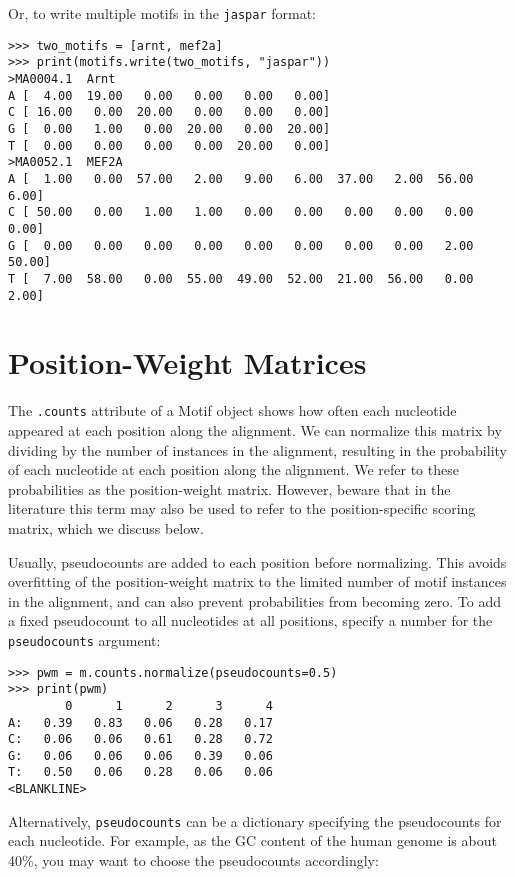 Or, to write multiple motifs in the \verb+jaspar+ format:
\begin{verbatim}
>>> two_motifs = [arnt, mef2a]
>>> print(motifs.write(two_motifs, "jaspar"))
>MA0004.1  Arnt
A [  4.00  19.00   0.00   0.00   0.00   0.00]
C [ 16.00   0.00  20.00   0.00   0.00   0.00]
G [  0.00   1.00   0.00  20.00   0.00  20.00]
T [  0.00   0.00   0.00   0.00  20.00   0.00]
>MA0052.1  MEF2A
A [  1.00   0.00  57.00   2.00   9.00   6.00  37.00   2.00  56.00   6.00]
C [ 50.00   0.00   1.00   1.00   0.00   0.00   0.00   0.00   0.00   0.00]
G [  0.00   0.00   0.00   0.00   0.00   0.00   0.00   0.00   2.00  50.00]
T [  7.00  58.00   0.00  55.00  49.00  52.00  21.00  56.00   0.00   2.00]
\end{verbatim}

\section{Position-Weight Matrices}

The \verb+.counts+ attribute of a Motif object shows how often each
nucleotide appeared at each position along the alignment. We can
normalize this matrix by dividing by the number of instances in the
alignment, resulting in the probability of each nucleotide at each
position along the alignment. We refer to these probabilities as
the position-weight matrix. However, beware that in the literature
this term may also be used to refer to the position-specific scoring
matrix, which we discuss below.

Usually, pseudocounts are added to each position before normalizing.
This avoids overfitting of the position-weight matrix to the limited
number of motif instances in the alignment, and can also prevent
probabilities from becoming zero. To add a fixed pseudocount to all
nucleotides at all positions, specify a number for the
\verb+pseudocounts+ argument:

\begin{verbatim}
>>> pwm = m.counts.normalize(pseudocounts=0.5)
>>> print(pwm)
        0      1      2      3      4
A:   0.39   0.83   0.06   0.28   0.17
C:   0.06   0.06   0.61   0.28   0.72
G:   0.06   0.06   0.06   0.39   0.06
T:   0.50   0.06   0.28   0.06   0.06
<BLANKLINE>
\end{verbatim}
Alternatively, \verb+pseudocounts+ can be a dictionary specifying the
pseudocounts for each nucleotide. For example, as the GC content of
the human genome is about 40\%, you may want to choose the
pseudocounts accordingly:

